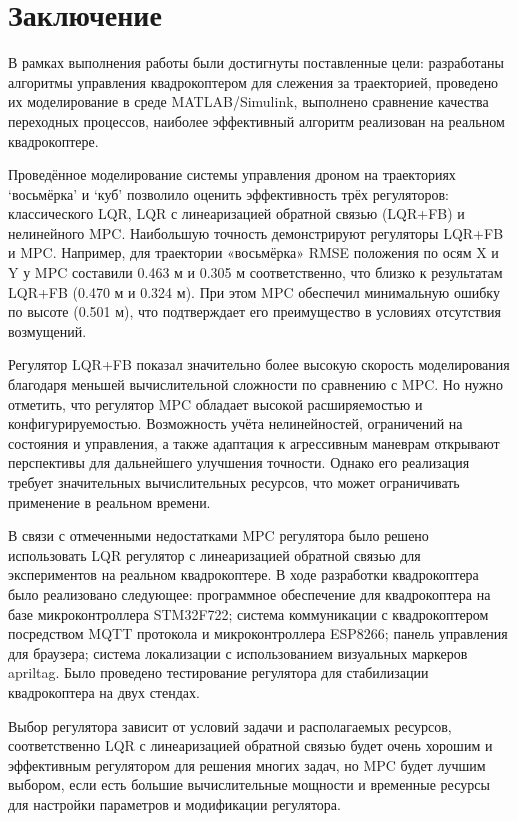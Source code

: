 \chapter*{Заключение}
\label{ch:chap1}

В рамках выполнения работы были достигнуты поставленные цели: 
разработаны алгоритмы управления квадрокоптером для слежения за траекторией, 
проведено их моделирование в среде MATLAB/Simulink, выполнено сравнение 
качества переходных процессов, наиболее эффективный алгоритм 
реализован на реальном квадрокоптере.

Проведённое моделирование системы управления дроном на траекториях `восьмёрка' и `куб' 
позволило оценить эффективность трёх регуляторов: классического LQR, LQR с 
линеаризацией обратной связью (LQR+FB) и нелинейного MPC. Наибольшую точность 
демонстрируют регуляторы LQR+FB и MPC. Например, для траектории «восьмёрка» 
RMSE положения по осям X и Y у MPC составили 0.463 м и 0.305 м соответственно, 
что близко к результатам LQR+FB (0.470 м и 0.324 м). При этом MPC обеспечил минимальную
 ошибку по высоте (0.501 м), что подтверждает его преимущество в условиях отсутствия возмущений.

Регулятор LQR+FB показал значительно более высокую скорость моделирования 
благодаря меньшей вычислительной сложности по сравнению с MPC. 
Но нужно отметить, что регулятор MPC обладает высокой расширяемостью и 
конфигурируемостью. Возможность 
учёта нелинейностей, ограничений на состояния и управления, 
а также адаптация к агрессивным маневрам открывают перспективы 
для дальнейшего улучшения точности. Однако его реализация 
требует значительных вычислительных ресурсов, что может ограничивать применение в реальном времени.

В связи с отмеченными недостатками MPC регулятора было решено использовать
LQR регулятор с линеаризацией обратной связью для экспериментов на реальном квадрокоптере.
В ходе разработки квадрокоптера было реализовано следующее: программное обеспечение для квадрокоптера на
базе микроконтроллера STM32F722;
система коммуникации с квадрокоптером посредством MQTT протокола и микроконтроллера ESP8266; 
панель управления для браузера; система локализации с использованием визуальных маркеров
apriltag. Было проведено тестирование регулятора для стабилизации квадрокоптера на двух стендах. 

Выбор регулятора зависит от условий задачи и располагаемых ресурсов, соответственно 
LQR с линеаризацией обратной связью
будет очень хорошим и эффективным регулятором для решения многих задач, 
но MPC будет лучшим выбором, если есть большие вычислительные мощности и временные ресурсы для 
настройки параметров и модификации регулятора. 

\endinput
